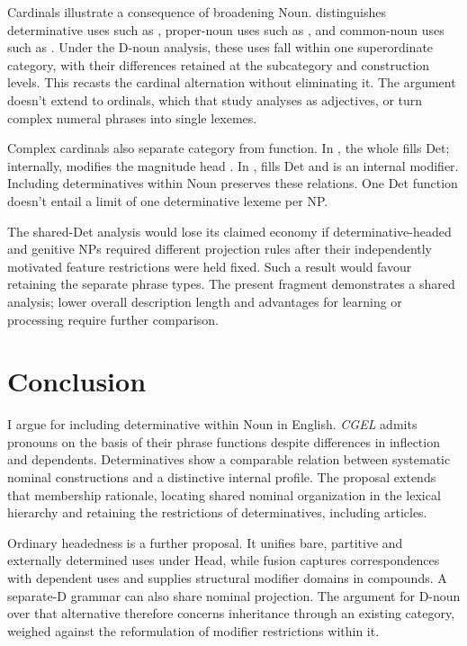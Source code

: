 \documentclass[12pt]{article}
\begin{document}
Cardinals illustrate a consequence of broadening Noun. \textcite{reynolds2026numerals} distinguishes determinative uses such as , proper-noun uses such as , and common-noun uses such as . Under the D-noun analysis, these uses fall within one superordinate category, with their differences retained at the subcategory and construction levels. This recasts the cardinal alternation without eliminating it. The argument doesn't extend to ordinals, which that study analyses as adjectives, or turn complex numeral phrases into single lexemes.

Complex cardinals also separate category from function. In , the whole  fills Det; internally,  modifies the magnitude head  \citep[§4]{reynolds2026numerals}. In ,  fills Det and  is an internal modifier. Including determinatives within Noun preserves these relations. One Det function doesn't entail a limit of one determinative lexeme per NP.

The shared-Det analysis would lose its claimed economy if determinative-headed and genitive NPs required different projection rules after their independently motivated feature restrictions were held fixed. Such a result would favour retaining the separate phrase types. The present fragment demonstrates a shared analysis; lower overall description length and advantages for learning or processing require further comparison.

\section{Conclusion}\label{sec:conclusion}

I argue for including determinative within Noun in English. \textit{CGEL} admits pronouns on the basis of their phrase functions despite differences in inflection and dependents. Determinatives show a comparable relation between systematic nominal constructions and a distinctive internal profile. The proposal extends that membership rationale, locating shared nominal organization in the lexical hierarchy and retaining the restrictions of determinatives, including articles.

Ordinary headedness is a further proposal. It unifies bare, partitive and externally determined uses under Head, while fusion captures correspondences with dependent uses and supplies structural modifier domains in compounds. A separate-D grammar can also share nominal projection. The argument for D-noun over that alternative therefore concerns inheritance through an existing category, weighed against the reformulation of modifier restrictions within it.
\end{document}
